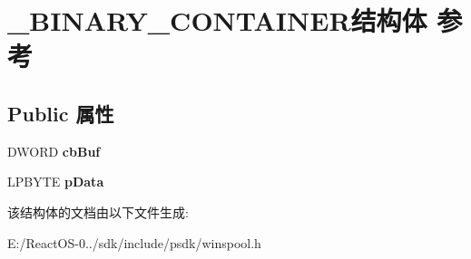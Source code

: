 \hypertarget{struct___b_i_n_a_r_y___c_o_n_t_a_i_n_e_r}{}\section{\+\_\+\+B\+I\+N\+A\+R\+Y\+\_\+\+C\+O\+N\+T\+A\+I\+N\+E\+R结构体 参考}
\label{struct___b_i_n_a_r_y___c_o_n_t_a_i_n_e_r}
\subsection*{Public 属性}
\begin{DoxyCompactItemize}
\item 
\mbox{\label{struct___b_i_n_a_r_y___c_o_n_t_a_i_n_e_r_ac93a10bcda7abec7933acb07dde42057}} 
D\+W\+O\+RD {\bfseries cb\+Buf}
\item 
\mbox{\label{struct___b_i_n_a_r_y___c_o_n_t_a_i_n_e_r_a064587dee50ee17ffec1be9140bbffef}} 
L\+P\+B\+Y\+TE {\bfseries p\+Data}
\end{DoxyCompactItemize}


该结构体的文档由以下文件生成\+:\begin{DoxyCompactItemize}
\item 
E\+:/\+React\+O\+S-\/0../sdk/include/psdk/winspool.\+h\end{DoxyCompactItemize}
